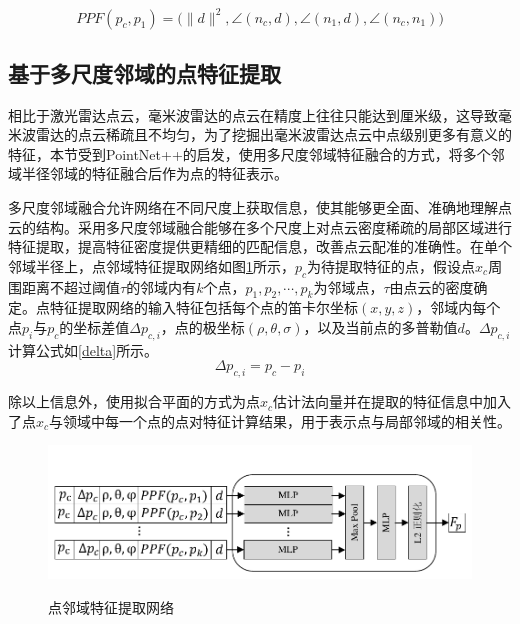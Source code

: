 \begin{equation}
	\label{ppf公式}
		PPF(p_c,p_1) = \big(\|d\|^2,\angle(n_c, d),\angle(n_1, d),\angle(n_c, n_1) \big)
\end{equation}



\subsection{基于多尺度邻域的点特征提取}
相比于激光雷达点云，毫米波雷达的点云在精度上往往只能达到厘米级，这导致毫米波雷达的点云稀疏且不均匀，为了挖掘出毫米波雷达点云中点级别更多有意义的特征，本节受到PointNet++的启发，使用多尺度邻域特征融合的方式\cite{qi2017pointnet++}，将多个邻域半径邻域的特征融合后作为点的特征表示。

多尺度邻域融合允许网络在不同尺度上获取信息，使其能够更全面、准确地理解点云的结构。采用多尺度邻域融合能够在多个尺度上对点云密度稀疏的局部区域进行特征提取\cite{RJXB202304025}，提高特征密度提供更精细的匹配信息，改善点云配准的准确性。在单个邻域半径上，点邻域特征提取网络如图\ref{点特征提取网络}所示，$p_c$为待提取特征的点，假设点$x_c$周围距离不超过阈值$\tau$的邻域内有$k$个点，$p_1,p_2,\cdots,p_k$为邻域点，$\tau$由点云的密度确定。点特征提取网络的输入特征包括每个点的笛卡尔坐标$(x,y,z)$，邻域内每个点$p_i$与$p_c$的坐标差值$\Delta p_{c,i}$，点的极坐标$(\rho,\theta,\sigma)$，以及当前点的多普勒值$d$。$\Delta p_{c,i}$计算公式如\eqref{delta}所示。
\begin{equation}
	\label{delta}
	\Delta p_{c,i} = p_c - p_i
\end{equation}

除以上信息外，使用拟合平面的方式为点$x_c$估计法向量并在提取的特征信息中加入了点$x_c$与领域中每一个点的点对特征计算结果，用于表示点与局部邻域的相关性。


\begin{figure}[htbp]
	\centering
	\includegraphics[width=\linewidth]{figures/点特征提取网络.pdf}\\
	\caption{点邻域特征提取网络}
	\label{点特征提取网络}
\end{figure}



